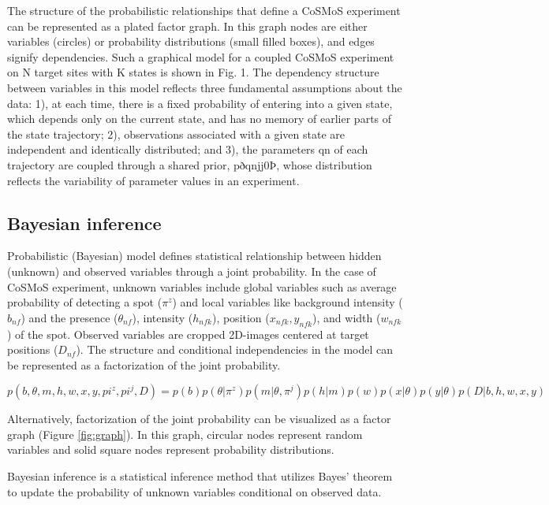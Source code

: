The structure of the probabilistic relationships that define a CoSMoS experiment can be represented as a plated factor graph. In this graph nodes are either variables (circles) or probability distributions (small filled boxes), and edges signify dependencies. Such a graphical model for a coupled CoSMoS experiment on N target sites with K states is shown in Fig. 1. The dependency structure between
variables in this model reflects three fundamental assumptions about the
data: 1), at each time, there is a fixed probability of entering into a given
state, which depends only on the current state, and has no memory of earlier
parts of the state trajectory; 2), observations associated with a given state
are independent and identically distributed; and 3), the parameters qn of
each trajectory are coupled through a shared prior, pðqnjj0Þ, whose distribution reflects the variability of parameter values in an experiment.

\subsection{Bayesian inference}

Probabilistic (Bayesian) model defines statistical relationship between hidden (unknown) and observed variables through a joint probability. In the case of CoSMoS experiment, unknown variables include global variables such as average probability of detecting a spot ($\pi^z$) and local variables like background intensity ($b_{nf}$) and the presence ($\theta_{nf}$), intensity ($h_{nfk}$), position ($x_{nfk}, y_{nfk}$), and width ($w_{nfk}$) of the spot. Observed variables are cropped 2D-images centered at target positions ($D_{nf}$). The structure and conditional independencies in the model can be represented as a factorization of the joint probability.

\textbf{\begin{equation*}
    p(b,\theta,m,h,w,x,y,pi^z,pi^j,D) = p(b)p(\theta|\pi^z)p(m|\theta,\pi^j)p(h|m)p(w)p(x|\theta)p(y|\theta)p(D|b,h,w,x,y)
\end{equation*}}


Alternatively, factorization of the joint probability can be visualized as a factor graph (Figure \ref{fig:graph}). In this graph, circular nodes represent random variables and solid square nodes represent probability distributions.

Bayesian inference is a statistical inference method that utilizes Bayes' theorem to update the probability of unknown variables conditional on observed data.

